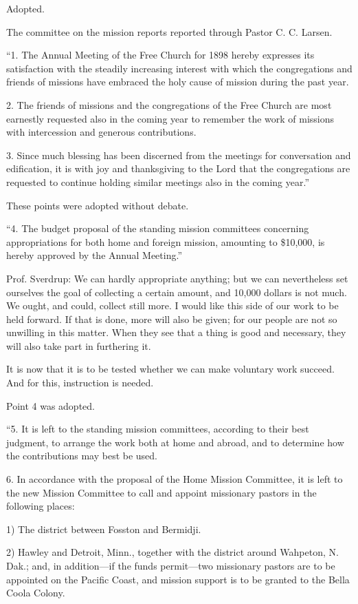Adopted.

The committee on the mission reports reported through Pastor C. C. Larsen.

“1. The Annual Meeting of the Free Church for 1898 hereby expresses its satisfaction with the steadily increasing interest with which the congregations and friends of missions have embraced the holy cause of mission during the past year.

2. The friends of missions and the congregations of the Free Church are most earnestly requested also in the coming year to remember the work of missions with intercession and generous contributions.

3. Since much blessing has been discerned from the meetings for conversation and edification, it is with joy and thanksgiving to the Lord that the congregations are requested to continue holding similar meetings also in the coming year.”

These points were adopted without debate.

“4. The budget proposal of the standing mission committees concerning appropriations for both home and foreign mission, amounting to \$10,000, is hereby approved by the Annual Meeting.”

Prof. Sverdrup: We can hardly appropriate anything; but we can nevertheless set ourselves the goal of collecting a certain amount, and 10,000 dollars is not much. We ought, and could, collect still more. I would like this side of our work to be held forward. If that is done, more will also be given; for our people are not so unwilling in this matter. When they see that a thing is good and necessary, they will also take part in furthering it.

It is now that it is to be tested whether we can make voluntary work succeed. And for this, instruction is needed.

Point 4 was adopted.

“5. It is left to the standing mission committees, according to their best judgment, to arrange the work both at home and abroad, and to determine how the contributions may best be used.

6. In accordance with the proposal of the Home Mission Committee, it is left to the new Mission Committee to call and appoint missionary pastors in the following places:

1) The district between Fosston and Bermidji.

2) Hawley and Detroit, Minn., together with the district around Wahpeton, N. Dak.; and, in addition—if the funds permit—two missionary pastors are to be appointed on the Pacific Coast, and mission support is to be granted to the Bella Coola Colony.

